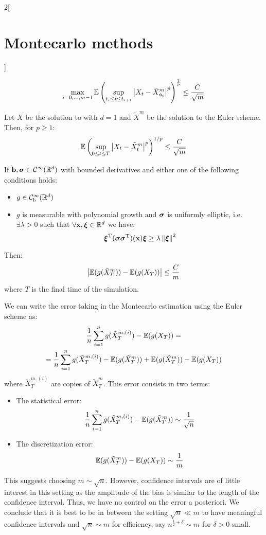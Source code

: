 \documentclass[../../../main_math.tex]{subfiles}
\begin{document}
\begin{multicols}{2}[\section{Montecarlo methods}]
\begin{lemma}
    $$
      \max_{i=0,\ldots,m-1}{\mathbb{E}\left(\sup_{t_i\leq t\leq t_{i+1}}\abs{X_t-\tilde{X}^m_{\phi_t}}^p\right)}^\frac{1}{p}\leq \frac{C}{\sqrt{m}}
    $$
  \end{lemma}
  \begin{theorem}
    Let $X$ be the solution to  with $d=1$ and $\tilde{X}^m$ be the solution to the Euler scheme. Then, for $p\geq 1$:
    $$
      {\mathbb{E}\left(\sup_{0\leq t\leq T}\abs{X_t-\tilde{X}^m_t}^p\right)}^{1/p}\leq \frac{C}{\sqrt{m}}
    $$
  \end{theorem}
  \begin{theorem}
    If $\boldsymbol{\mathrm{b}},\boldsymbol{\mathrm{\sigma}}\in \mathcal{C}^\infty(\mathbb{R}^d)$ with bounded derivatives and either one of the following conditions holds:
    \begin{itemize}
      \item $g\in \mathcal{C}^\infty_\text{b}(\mathbb{R}^d)$
      \item $g$ is measurable with polynomial growth and $\boldsymbol{\mathrm{\sigma}}$ is uniformly elliptic, i.e.\ $\exists\lambda>0$ such that $\forall \boldsymbol{\mathrm{x}},\boldsymbol{\mathrm{\xi}}\in\mathbb{R}^d$ we have:
            $$
              {\boldsymbol{\mathrm{\xi}}}^{\mathrm{T}}(\boldsymbol{\mathrm{\sigma}}{\boldsymbol{\mathrm{\sigma}}}^{\mathrm{T}})(\boldsymbol{\mathrm{x}})\boldsymbol{\mathrm{\xi}}\geq \lambda\left\|\boldsymbol{\mathrm{\xi}}\right\|^2
            $$
    \end{itemize}
    Then:
    $$
      \abs{\mathbb{E}(g(\tilde{X}^m_T))- \mathbb{E}(g(X_T))}\leq \frac{C}{m}
    $$
    where $T$ is the final time of the simulation.
  \end{theorem}
  \begin{remark}
    We can write the error taking in the Montecarlo estimation using the Euler scheme as:
    \begin{multline*}
      \frac{1}{n}\sum_{i=1}^n g(\tilde{X}^{m,(i)}_T)-\mathbb{E}(g(X_T))=\\=\frac{1}{n}\sum_{i=1}^n g(\tilde{X}^{m,(i)}_T)-\mathbb{E}(g(\tilde{X}^m_T))+\mathbb{E}(g(\tilde{X}^m_T))-\mathbb{E}(g(X_T))
    \end{multline*}
    where $\tilde{X}^{m,(i)}_T$ are \iid copies of $\tilde{X}^m_T$. This error consists in two terms:
    \begin{itemize}
      \item The statistical error: $$\frac{1}{n}\sum_{i=1}^n g(\tilde{X}^{m,(i)}_T)-\mathbb{E}(g(\tilde{X}^m_T))\sim \frac{1}{\sqrt{n}}$$
      \item The discretization error:$$\mathbb{E}(g(\tilde{X}^m_T))-\mathbb{E}(g(X_T))\sim \frac{1}{m}$$
    \end{itemize}
    This suggests choosing $m\sim \sqrt{n}$. However, confidence intervals are of little interest in this setting as the amplitude of the bias is similar to the length of the confidence interval. Thus, we have no control on the error a posteriori. We conclude that it is best to be in between the setting $\sqrt{n}\ll m$ to have meaningful confidence intervals and $\sqrt{n}\sim m$ for efficiency, say $n^{\frac{1}{2}+\delta}\sim m$ for $\delta>0$ small.

\end{remark}
\end{multicols}
\end{document}
